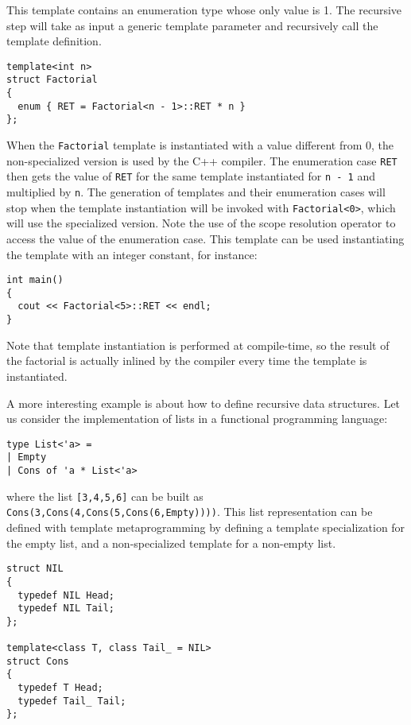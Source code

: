 This template contains an enumeration type whose only value is 1. The recursive step will take as input a generic template parameter and recursively call the template definition.

\begin{lstlisting}
template<int n>
struct Factorial
{
  enum { RET = Factorial<n - 1>::RET * n }
};
\end{lstlisting}

\noindent
When the \texttt{Factorial} template is instantiated with a value different from 0, the non-specialized version is used by the C++ compiler. The enumeration case \texttt{RET} then gets the value of \texttt{RET} for the same template instantiated for \texttt{n - 1} and multiplied by \texttt{n}. The generation of templates and their enumeration cases will stop when the template instantiation will be invoked with \texttt{Factorial<0>}, which will use the specialized version. Note the use of the scope resolution operator to access the value of the enumeration case. This template can be used instantiating the template with an integer constant, for instance:

\begin{lstlisting}
int main()
{
  cout << Factorial<5>::RET << endl;
}
\end{lstlisting}

\noindent
Note that template instantiation is performed at compile-time, so the result of the factorial is actually inlined by the compiler every time the template is instantiated.

A more interesting example is about how to define recursive data structures. Let us consider the implementation of lists in a functional programming language:

\begin{lstlisting}
type List<'a> =
| Empty
| Cons of 'a * List<'a>
\end{lstlisting}

\noindent
where the list \texttt{[3,4,5,6]} can be built as \texttt{Cons(3,Cons(4,Cons(5,Cons(6,Empty))))}. This list representation can be defined with template metaprogramming by defining a template specialization for the empty list, and a non-specialized template for a non-empty list.

\begin{lstlisting}
struct NIL
{
  typedef NIL Head;
  typedef NIL Tail;
};

template<class T, class Tail_ = NIL>
struct Cons
{
  typedef T Head;
  typedef Tail_ Tail;
};
\end{lstlisting}

